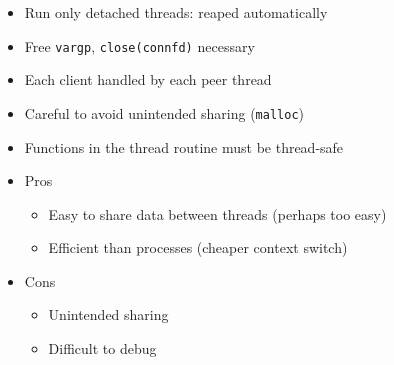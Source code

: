 \documentclass[12pt]{article}
\begin{document}
{\begin{itemize}
\begin{itemize}
		\item Run only detached threads: reaped automatically
		\item Free \texttt{vargp}, \texttt{close(connfd)} necessary
		\item Each client handled by each peer thread
		\item Careful to avoid unintended sharing (\texttt{malloc})
		\item Functions in the thread routine must be thread-safe
		\item Pros
		\begin{itemize}
			\item Easy to share data between threads (perhaps too easy)
			\item Efficient than processes (cheaper context switch)
		\end{itemize}
		\item Cons
		\begin{itemize}
			\item Unintended sharing
			\item Difficult to debug
		\end{itemize}
	\end{itemize}
\end{itemize}

}
\end{document}
